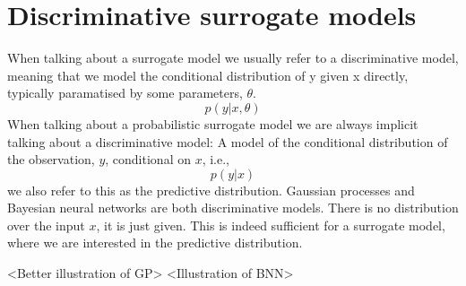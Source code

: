 \chapter{Discriminative surrogate models}
When talking about a surrogate model we usually refer to a discriminative model, meaning
that we model the conditional distribution of y given x directly, typically paramatised by some parameters, $\theta$. 
$$p(y|x, \theta)$$
When talking about a probabilistic surrogate model we are always implicit talking about a
discriminative model: A model of the conditional distribution of the observation, $y$, 
conditional on $x$, i.e., 
$$p(y|x)$$
we also refer to this as the predictive distribution. Gaussian processes and Bayesian neural networks
are both discriminative models. There is no distribution over the input $x$, it is just given. 
This is indeed sufficient for a surrogate model, where we are interested in the predictive distribution. 

<Better illustration of GP>
<Illustration of BNN>








